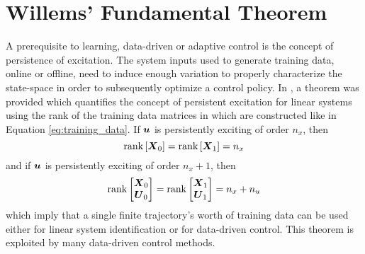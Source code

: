 \section{Willems' Fundamental Theorem}
A prerequisite to learning, data-driven or adaptive control is the concept of persistence of excitation.  The system inputs used to generate training data, online or offline, need to induce enough variation to properly characterize the state-space in order to subsequently optimize a control policy.  In \cite{willems2005note}, a theorem was provided which quantifies the concept of persistent excitation for linear systems using the rank of the training data matrices in which are constructed like in Equation \eqref{eq:training_data}.  If $\vb*{u}$ is persistently exciting of order $n_{x}$, then
\begin{equation}
\label{eq:willems_1}
	\text{rank}\left[ \vb*{X}_{0} \right] = \text{rank}\left[ \vb*{X}_{1} \right] =  n_{x}
\end{equation}
and if $\vb*{u}$ is persistently exciting of order $n_{x} + 1$, then
\begin{equation}
\label{eq:willems_2}
	\text{rank} \begin{bmatrix} \vb*{X}_{0}\\ \vb*{U}_{0} \end{bmatrix}
		= \text{rank} \begin{bmatrix} \vb*{X}_{1}\\ \vb*{U}_{1} \end{bmatrix} = n_{x} + n_{u}
\end{equation}
which imply that a single finite trajectory's worth of training data can be used either for linear system identification or for data-driven control.  This theorem is exploited by many data-driven control methods.

